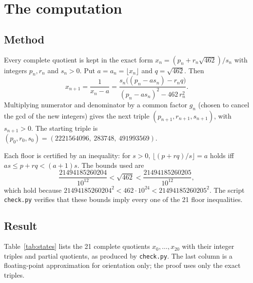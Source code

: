 \documentclass[11pt]{article}
\begin{document}
\section{The computation}

\subsection{Method}

Every complete quotient is kept in the exact form $x_n = (p_n + r_n\sqrt{462})/s_n$ with integers
$p_n, r_n$ and $s_n > 0$. Put $a = a_n = \lfloor x_n \rfloor$ and $q = \sqrt{462}$. Then
\[
x_{n+1} = \frac{1}{x_n - a} = \frac{s_n\bigl((p_n - a s_n) - r_n q\bigr)}{(p_n - a s_n)^2 - 462\, r_n^2}.
\]
Multiplying numerator and denominator by a common factor $g_n$ (chosen to cancel the gcd of the
new integers) gives the next triple $(p_{n+1}, r_{n+1}, s_{n+1})$, with $s_{n+1} > 0$. The
starting triple is $(p_0, r_0, s_0) = (2221564096,\ 283748,\ 491993569)$.

Each floor is certified by an inequality: for $s > 0$, $\lfloor (p + r q)/s \rfloor = a$ holds
iff $as \le p + rq < (a+1)s$. The bounds used are
\[
\frac{21494185260204}{10^{12}} < \sqrt{462} < \frac{21494185260205}{10^{12}},
\]
which hold because $21494185260204^2 < 462 \cdot 10^{24} < 21494185260205^2$. The script
\texttt{check.py} verifies that these bounds imply every one of the 21 floor inequalities.

\subsection{Result}

Table~\ref{tab:states} lists the 21 complete quotients $x_0, \dots, x_{20}$ with their integer
triples and partial quotients, as produced by \texttt{check.py}. The last column is a
floating-point approximation for orientation only; the proof uses only the exact triples.
\end{document}
